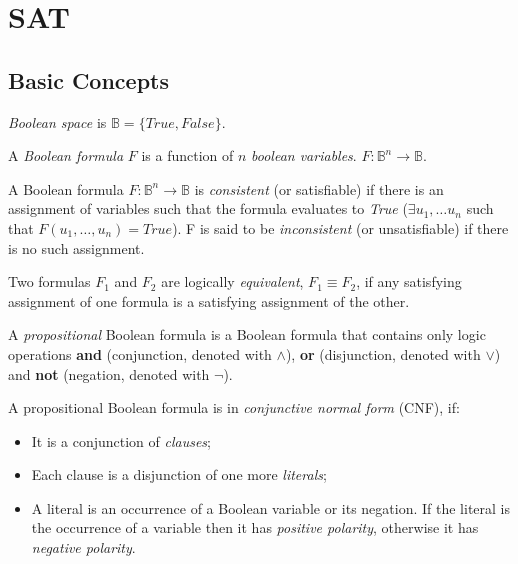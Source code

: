 \chapter{SAT}

\section{Basic Concepts}

\begin{mydef}
  \emph{Boolean space} is $\mathbb{B} = \{ True, False \}$.
\end{mydef}

\begin{mydef}
  A \emph{Boolean formula} $F$ is a function of $n$ \emph{boolean variables}.
  $F : \mathbb{B}^n \rightarrow \mathbb{B}$.
\end{mydef}

\begin{mydef}
  A Boolean formula $F : \mathbb{B}^n \rightarrow \mathbb{B}$ is
  \emph{consistent} (or satisfiable) if there is an assignment of
  variables such that the formula evaluates to \emph{True}
  ($\exists u_1, \ldots u_n$ such that $F(u_1, \ldots, u_n) = True$).
  F is said to be \emph{inconsistent} (or unsatisfiable) if
  there is no such assignment.
\end{mydef}

\begin{mydef}
  Two formulas $F_1$ and $F_2$ are logically \emph{equivalent},
  $F_1 \equiv F_2$, if any satisfying assignment of one formula is
  a satisfying assignment of the other.
\end{mydef}

\begin{mydef}
  A \emph{propositional} Boolean formula is a Boolean formula that contains only
  logic operations \textbf{and} (conjunction, denoted with $\land$),
  \textbf{or} (disjunction, denoted with $\lor$) and \textbf{not}
  (negation, denoted with $\neg$).
\end{mydef}

A propositional Boolean formula is in \emph{conjunctive normal form}
(CNF), if:
\begin{itemize}
  \item It is a conjunction of \emph{clauses};
  \item Each clause is a disjunction of one more \emph{literals};
  \item A literal is an occurrence of a Boolean variable or its negation.
  If the literal is the occurrence of a variable
  then it has \emph{positive polarity}, otherwise it has \emph{negative
  polarity}.
\end{itemize}

